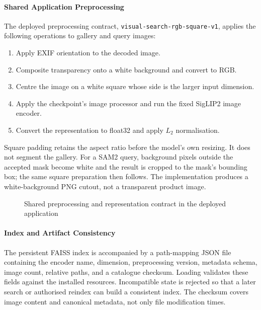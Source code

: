 \paragraph{Shared Application Preprocessing}
The deployed preprocessing contract, \texttt{visual-search-rgb-square-v1}, applies
the following operations to gallery and query images:
\begin{enumerate}[leftmargin=1.8em,itemsep=0.3em]
 \item Apply EXIF orientation to the decoded image.
 \item Composite transparency onto a white background and convert to RGB.
 \item Centre the image on a white square whose side is the larger input dimension.
 \item Apply the checkpoint's image processor and run the fixed SigLIP2 image encoder.
 \item Convert the representation to float32 and apply $L_2$ normalisation.
\end{enumerate}
Square padding retains the aspect ratio before the model's own resizing. It
does not segment the gallery. For a SAM2 query, background pixels outside the
accepted mask become white and the result is cropped to the mask's bounding box;
the same square preparation then follows. The implementation produces a
white-background PNG cutout, not a transparent product image.

\begin{figure}[H]
\centering
{}
\caption{Shared preprocessing and representation contract in the deployed application}
\label{fig:preprocessing}
\end{figure}

\paragraph{Index and Artifact Consistency}
The persistent FAISS index is accompanied by a path-mapping JSON file containing
the encoder name, dimension, preprocessing version, metadata schema, image count,
relative paths, and a catalogue checksum. Loading validates these fields against
the installed resources. Incompatible state is rejected so that a later search
or authorised reindex can build a consistent index. The checksum covers image
content and canonical metadata, not only file modification times.

